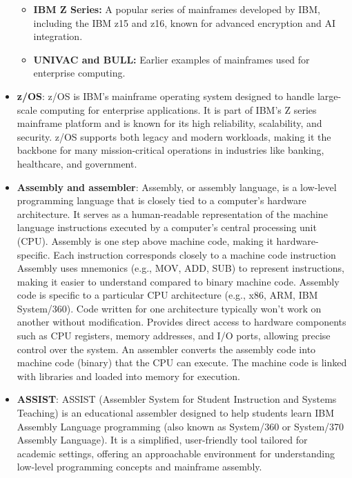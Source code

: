 \documentclass{report}
\begin{document}
\begin{itemize}
\begin{itemize}
                \item \textbf{IBM Z Series:} A popular series of mainframes developed by IBM, including the IBM z15 and z16, known for advanced encryption and AI integration.
                \item \textbf{UNIVAC and BULL:} Earlier examples of mainframes used for enterprise computing.
            \end{itemize}
        \item \textbf{z/OS}: z/OS is IBM's mainframe operating system designed to handle large-scale computing for enterprise applications. It is part of IBM’s Z series mainframe platform and is known for its high reliability, scalability, and security. z/OS supports both legacy and modern workloads, making it the backbone for many mission-critical operations in industries like banking, healthcare, and government.
        \item \textbf{Assembly and assembler}: Assembly, or assembly language, is a low-level programming language that is closely tied to a computer's hardware architecture. It serves as a human-readable representation of the machine language instructions executed by a computer's central processing unit (CPU).
            \bigbreak \noindent 
            Assembly is one step above machine code, making it hardware-specific. Each instruction corresponds closely to a machine code instruction
            \bigbreak \noindent 
            Assembly uses mnemonics (e.g., MOV, ADD, SUB) to represent instructions, making it easier to understand compared to binary machine code.
            \bigbreak \noindent 
            Assembly code is specific to a particular CPU architecture (e.g., x86, ARM, IBM System/360). Code written for one architecture typically won't work on another without modification.
            \bigbreak \noindent 
            Provides direct access to hardware components such as CPU registers, memory addresses, and I/O ports, allowing precise control over the system.
            \bigbreak \noindent 
            An assembler converts the assembly code into machine code (binary) that the CPU can execute. The machine code is linked with libraries and loaded into memory for execution.
        \item \textbf{ASSIST}: ASSIST (Assembler System for Student Instruction and Systems Teaching) is an educational assembler designed to help students learn IBM Assembly Language programming (also known as System/360 or System/370 Assembly Language). It is a simplified, user-friendly tool tailored for academic settings, offering an approachable environment for understanding low-level programming concepts and mainframe assembly.

\end{itemize}
\end{document}
